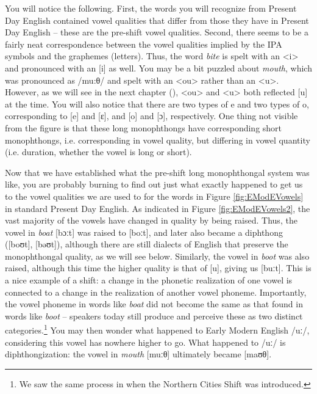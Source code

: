 \noindent You will notice the following. First, the words you will recognize from Present Day English contained vowel qualities that differ from those they have in Present Day English -- these are the pre-shift vowel qualities. Second, there seems to be a fairly neat correspondence between the vowel qualities implied by the IPA symbols and the graphemes (letters). Thus, the word \textit{bite} is spelt with an <i> and pronounced with an [i] as well. You may be a bit puzzled about \textit{mouth}, which was pronounced as /mu:θ/ and spelt with an <ou> rather than an <u>. However, as we will see in the next chapter (), <ou> and <u> both reflected [u] at the time. You will also notice that there are two types of e and two types of o, corresponding to [e] and [ɛ], and [o] and [ɔ], respectively. One thing not visible from the figure is that these long monophthongs have corresponding short monophthongs, i.e. corresponding in vowel quality, but differing in vowel quantity (i.e. duration, whether the vowel is long or short).

Now that we have established what the pre-shift long monophthongal system was like, you are probably burning to find out just what exactly happened to get us to the vowel qualities we are used to for the words in Figure \ref{fig:EModEVowels} in standard Present Day English. As indicated in Figure \ref{fig:EModEVowels2}, the vast majority of the vowels have changed in quality by being raised. Thus, the vowel in \textit{boat} [bɔːt] was raised to [boːt], and later also became a diphthong ([boʊt], [bəʊt]), although there are still dialects of English that preserve the monophthongal quality, as we will see below. Similarly, the vowel in \textit{boot} was also raised, although this time the higher quality is that of [u], giving us [buːt]. This is a nice example of a shift: a change in the phonetic realization of one vowel  is connected to a change in the realization of another vowel phoneme. Importantly, the vowel phoneme in words like \textit{boat} did not become the same as that found in words like \textit{boot} -- speakers today still produce and perceive these as two distinct categories.\footnote{We saw the same process in  when the Northern Cities Shift was introduced.} You may then wonder what happened to Early Modern English /uː/, considering this vowel has nowhere higher to go. What happened to /uː/ is diphthongization: the vowel in \textit{mouth} [muːθ] ultimately became [maʊθ].

